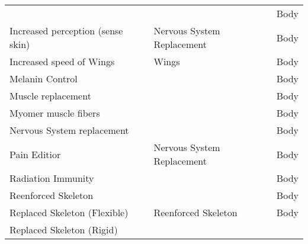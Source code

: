\documentclass[twoside]{book}
\begin{document}
\begin{longtable}{p{1.25in}p{2em}ll}
  &
  
  &
  
  &
   Body 
  \tabularnewline
      
  \raggedright
           Increased perception (sense
           skin) 
  &
  
  &
   Nervous System
           Replacement 
  &
   Body 
  \tabularnewline
      
  \raggedright
           Increased speed of Wings
           
  &
  
  &
   Wings 
  &
   Body 
  \tabularnewline
      
  \raggedright
           Melanin Control 
  &
  
  &
  
  &
   Body 
  \tabularnewline
      
  \raggedright
           Muscle replacement 
  &
  
  &
  
  &
   Body 
  \tabularnewline
      
  \raggedright
           Myomer muscle fibers 
  &
  
  &
  
  &
   Body 
  \tabularnewline
      
  \raggedright
           Nervous System replacement
           
  &
  
  &
  
  &
   Body 
  \tabularnewline
      
  \raggedright
           Pain Editior 
  &
  
  &
   Nervous System
           Replacement 
  &
   Body 
  \tabularnewline
      
  \raggedright
           Radiation Immunity 
  &
  
  &
  
  &
   Body 
  \tabularnewline
      
  \raggedright
           Reenforced Skeleton 
  &
  
  &
  
  &
   Body 
  \tabularnewline
      
  \raggedright
           Replaced Skeleton (Flexible)
           
  &
  
  &
   Reenforced Skeleton
           
  &
   Body 
  \tabularnewline
      
  \raggedright
           Replaced Skeleton (Rigid)
           

\end{longtable}
\end{document}
